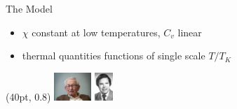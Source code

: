 \documentclass[aspectratio=169]{beamer}
\begin{document}
\begin{frame}[noframenumbering]{The Model}
{\begin{minipage}{0.6\textwidth}
\begin{itemize}[<+-|alert@+>]
\item \(\chi\) constant at low temperatures, \(C_v\) linear\\[10pt]
\item thermal quantities functions of single scale \(T/T_K\)\\[10pt]
\end{itemize}
\end{minipage}
\begin{minipage}{0.35\textwidth}
\end{minipage}
\begin{textblock*}{\textwidth}(40pt, 0.8\textheight)
	\centering
	\hspace*{\fill}
	\includegraphics[height=30pt]{figures/pwanderson.jpg}
	\hspace*{\fill}
	\includegraphics[height=30pt]{figures/kgwilson.jpg}

\end{textblock*}}
\end{frame}
\end{document}
